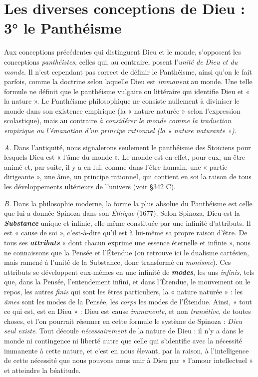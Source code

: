 \section{Les diverses conceptions de Dieu : 3° le Panthéisme}%
Aux conceptions précédentes qui distinguent Dieu et le monde,
s’opposent les conceptions {\it panthéistes}, celles qui, au contraire, posent
l’{\it unité de Dieu et du monde}. Il n’est cependant pas correct de définir
le Panthéisme, ainsi qu’on le fait parfois, comme la doctrine selon
laquelle Dieu est {\it immanent} au monde. Une telle formule ne définit
que le panthéisme vulgaire ou littéraire qui identifie Dieu et « la
nature ». Le Panthéisme philosophique ne consiste nullement à diviniser
le monde dans son existence empirique (la « nature naturée »
selon l'expression scolastique), mais au contraire {\it à considérer le
monde comme la traduction empirique ou l’émanation d'un principe
rationnel (la « nature naturante »)}.

{\it A.} Dans l’antiquité, nous signalerons seulement le panthéisme des
Stoïciens pour lesquels Dieu est « l’âme du monde ». Le monde est
en effet, pour eux, un être animé et, par suite, il y a en lui, comme dans
l’être humain, une « partie dirigeante », une âme, un principe rationnel,
qui contient en soi la raison de tous les développements ultérieurs
de l’univers (voir \S 342 C).

{\it B.} Dans la philosophie moderne, la forme la plus absolue du Panthéisme
est celle que lui a donnée Spinoza dans son {\it Éthique} (1677).
Selon Spinoza,
Dieu est la \textbf{\textit {Substance}} unique et infinie, elle-même
constituée par une infinité d’attributs. Il est « cause de soi »,
c’est-à-dire qu’il est à lui-même sa propre raison d’être. De tous ses
\textbf{\textit {attributs}} « dont chacun exprime une essence éternelle et infinie »,
nous ne connaissons que la Pensée et l’Étendue (on retrouve ici le
dualisme cartésien, mais ramené à l’unité de la Substance, donc
transformé en {\it monisme}). Ces attributs se développent eux-mêmes en
une infinité de \textbf{\textit {modes}}, les uns {\it infinis}, tels que, dans la Pensée, l’entendement
infini, et dans l’Étendue, le mouvement ou le repos, les autres
{\it finis} qui sont les êtres particuliers, la « nature naturée » : les {\it âmes}
sont les modes de la Pensée, les {\it corps} les modes de l’Étendue. Ainsi,
« tout ce qui est, est en Dieu » : Dieu est cause {\it immanente}, et non
{\it transitive}, de toutes choses, et l’on pourrait résumer en cette formule
le système de Spinoza : {\it Dieu seul existe}. Tout découle {\it nécessairement}
de la nature de Dieu : il n’y a dans le monde ni contingence ni liberté
autre que celle qui s’identifie avec la nécessité immanente à cette
nature, et c’est en nous élevant, par la raison, à l'intelligence de
cette nécessité que nous pouvons
nous unir à Dieu par « l'amour
intellectuel » et atteindre la béatitude.

